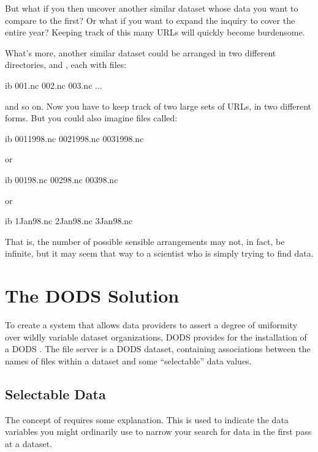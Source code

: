 But what if you then uncover another similar dataset whose data you
want to compare to the first?  Or what if you want to expand the
inquiry to cover the entire year?  Keeping track of this many URLs
will quickly become burdensome.

What's more, another similar dataset could be arranged in two
different directories,  and , each with files:

\begin{vcode}{ib}
001.nc
002.nc
003.nc
...
\end{vcode}

and so on.  Now you have to keep track of two large sets of URLs, in
two different forms.  But you could also imagine files called:

\begin{vcode}{ib}
0011998.nc
0021998.nc
0031998.nc
\end{vcode}

or 

\begin{vcode}{ib}
00198.nc
00298.nc
00398.nc
\end{vcode}

or 

\begin{vcode}{ib}
1Jan98.nc
2Jan98.nc
3Jan98.nc
\end{vcode}

That is, the number of possible sensible arrangements may not, in
fact, be infinite, but it may seem that way to a scientist who is
simply trying to find data.


\section{The DODS Solution}
\label{fs,solution}

To create a system that allows data providers to assert a degree of
uniformity over wildly variable dataset organizations, DODS provides
for the installation of a DODS .  The file server is
a DODS dataset, containing associations between the names of files
within a dataset and some ``selectable'' data values.


\subsection{Selectable Data}
\label{fs,selectable}

The concept of  requires some explanation.  This
is used to indicate the data variables you might ordinarily use to
narrow your search for data in the first pass at a dataset.

